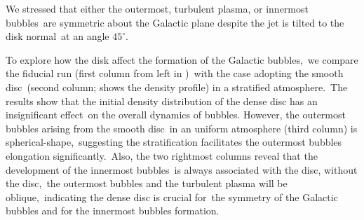 \documentclass[twocolumn]{aastex631}
\begin{document}
 We stressed that either the outermost, turbulent plasma, or innermost bubbles\
 are symmetric about the Galactic plane despite the jet is tilted to the disk normal\
 at an angle $45^{\circ}$.

 To explore how the disk affect the formation of the Galactic bubbles,\
 we compare the fiducial run (first column from left in )\
 with the case adopting the smooth disc\
 (second column;  shows the density profile) in a stratified atmosphere.\
 The results show that the initial density distribution of the dense disc has an insignificant effect\
 on the overall dynamics of bubbles. However, the outermost bubbles arising from the smooth disc\
 in an uniform atmosphere (third column) is spherical-shape,\
 suggesting the stratification facilitates the outermost bubbles elongation significantly.\
 Also, the two rightmost columns reveal that the development of the innermost bubbles\
 is always associated with the disc, without the disc,\
 the outermost bubbles and the turbulent plasma will be oblique,\
 indicating the dense disc is crucial for\
 the symmetry of the Galactic bubbles and for the innermost bubbles formation.
\end{document}
